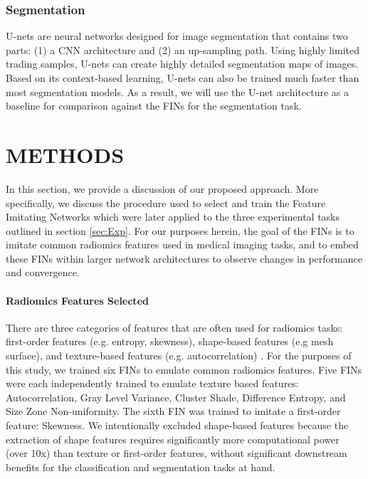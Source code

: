 \documentclass{article}
\begin{document}
\subsubsection{Segmentation}
U-nets are neural networks designed for image segmentation that
contains two parts: (1) a CNN architecture and (2) an up-sampling path. Using highly limited trading samples, U-nets can create highly detailed segmentation maps of images. Based on its context-based learning, U-nets can also be trained much faster than most segmentation models. \cite{9446143} As a result, we will use the U-net architecture as a baseline for comparison against the FINs for the segmentation task.

\section{METHODS} \label{sec:Meth}
In this section, we provide a discussion of our proposed approach. More specifically, we discuss the procedure used to select and train the Feature Imitating Networks which were later applied to the three experimental tasks outlined in section \ref{sec:Exp}. For our purposes herein, the goal of the FINs is to imitate common radiomics features used in medical imaging tasks, and to embed these FINs within larger network architectures to observe changes in performance and convergence. 

\paragraph*{Radiomics Features Selected} There are three categories of features that are often used for radiomics tasks: first-order features (e.g. entropy, skewness), shape-based features (e.g mesh surface), and texture-based features (e.g. autocorrelation) \cite{KUMAR20121234}. For the purposes of this study, we trained six FINs to emulate common radiomics features. Five FINs were each independently trained to emulate texture based features: Autocorrelation, Gray Level Variance, Cluster Shade, Difference Entropy, and Size Zone Non-uniformity. The sixth FIN was trained to imitate a first-order feature: Skewness. We intentionally excluded shape-based features because the extraction of shape features requires significantly more computational power (over 10x) than texture or first-order features, without significant downstream benefits for the classification and segmentation tasks at hand.
\end{document}
